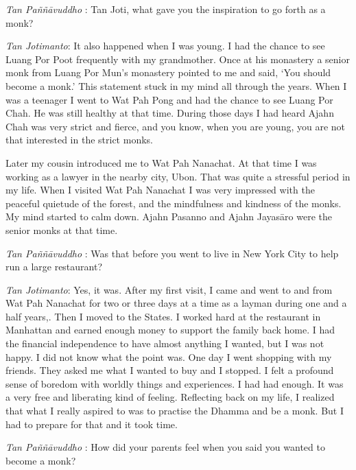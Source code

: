 \emph{Tan Paññāvuddho} : Tan Joti, what gave you the inspiration to go
forth as a monk?

\emph{Tan Jotimanto}: It also happened when I was young. I had the
chance to see Luang Por Poot frequently with my grandmother. Once at his
monastery a senior monk from Luang Por Mun's monastery pointed to me and
said, `You should become a monk.' This statement stuck in my mind all
through the years. When I was a teenager I went to Wat Pah Pong and had
the chance to see Luang Por Chah. He was still healthy at that time.
During those days I had heard Ajahn Chah was very strict and fierce, and
you know, when you are young, you are not that interested in the strict
monks.

Later my cousin introduced me to Wat Pah Nanachat. At that time I was
working as a lawyer in the nearby city, Ubon. That was quite a stressful
period in my life. When I visited Wat Pah Nanachat I was very impressed
with the peaceful quietude of the forest, and the mindfulness and
kindness of the monks. My mind started to calm down. Ajahn Pasanno and
Ajahn Jayasāro were the senior monks at that time.

\emph{Tan Paññāvuddho} : Was that before you went to live in New York
City to help run a large restaurant?

\emph{Tan Jotimanto}: Yes, it was. After my first visit, I came and went
to and from Wat Pah Nanachat for two or three days at a time as a layman
during one and a half years,. Then I moved to the States. I worked hard
at the restaurant in Manhattan and earned enough money to support the
family back home. I had the financial independence to have almost
anything I wanted, but I was not happy. I did not know what the point
was. One day I went shopping with my friends. They asked me what I
wanted to buy and I stopped. I felt a profound sense of boredom with
worldly things and experiences. I had had enough. It was a very free and
liberating kind of feeling. Reflecting back on my life, I realized that
what I really aspired to was to practise the Dhamma and be a monk. But I
had to prepare for that and it took time.

\emph{Tan Paññāvuddho} : How did your parents feel when you said you
wanted to become a monk?

